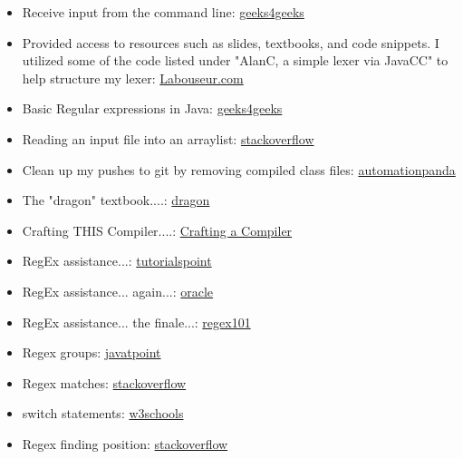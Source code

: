 \documentclass[letterpaper, 10pt,DIV=13]{scrartcl}
\numberwithin{equation}{section} %
\numberwithin{figure}{section} %
\numberwithin{table}{section} %
\begin{document}
\begin{itemize}
    \item Receive input from the command line: \href{https://www.geeksforgeeks.org/command-line-arguments-in-java/}{geeks4geeks}
    \item Provided access to resources such as slides, textbooks, and code snippets. I utilized some of the code listed under "AlanC, a simple lexer via JavaCC" to help structure my lexer: \href{https://www.labouseur.com/courses/compilers/}{Labouseur.com}
    \item Basic Regular expressions in Java: \href{https://www.w3schools.com/java/java_regex.asp}{geeks4geeks}
    \item Reading an input file into an arraylist: \href{https://stackoverflow.com/questions/5343689/java-reading-a-file-into-an-arraylist}{stackoverflow}
    \item Clean up my pushes to git by removing compiled class files: \href{https://automationpanda.com/2018/09/19/ignoring-files-with-git/#:~:text=Use%20the%20asterisk%20(%E2%80%9C*%E2%80%9D,class%E2%80%9D%20extension.)}{automationpanda}
    \item The "dragon" textbook....: \href{https://www.amazon.com/Compilers-Principles-Techniques-Tools-Edition/dp/0321486811}{dragon}
    \item Crafting THIS Compiler....: \href{https://www.amazon.com/Crafting-Compiler-Charles-N-Fischer/dp/0136067050}{Crafting a Compiler}
    \item RegEx assistance...: \href{https://www.tutorialspoint.com/java/java_regular_expressions.htm}{tutorialspoint}
    \item RegEx assistance... again...: \href{https://docs.oracle.com/javase/7/docs/api/java/util/regex/Pattern.html}{oracle}
    \item RegEx assistance... the finale...: \href{https://regex101.com/}{regex101}
    \item Regex groups: \href{https://www.javatpoint.com/post/java-matcher-group-method}{javatpoint}
    \item Regex matches: \href{https://stackoverflow.com/questions/21395110how-to-check-a-string-in-java-equals-to-a-regex-pattern}{stackoverflow}
    \item switch statements: \href{https://www.w3schools.com/java/java_switch.asp}{w3schools}
    \item Regex finding position: \href{https://stackoverflow.com/questions/8938498/get-the-index-of-a-pattern-in-a-string-using-regex}{stackoverflow}

\end{itemize}
\end{document}
